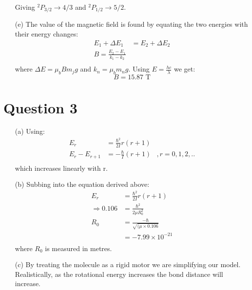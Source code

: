 \documentclass[10pt,a4paper]{article}
\begin{document}
\begin{itemize}
	Giving $^{2}P_{3/2} \rightarrow 4/3$ and $^{2}P_{1/2} \rightarrow 5/2$.

	\item[(e)] The value of the magnetic field is found by equating the two energies with their energy changes:
		\begin{align*}
			E_{1} + \Delta E_{1} &= E_{2} + \Delta E_{2} \\
			B = \frac{E_{2} - E_{1}}{k_{1}-k_{2}} \\
		\end{align*}
	where $\Delta E = \mu_{b}B m_{j}g$ and $k_{n} = \mu_{b}m_{n}g$. Using $E = \frac{hc}{\lambda}$ we get:
		\begin{equation*}
			B = 15.87 \mbox{ T}
		\end{equation*}
\end{itemize}

\section*{Question 3}
\begin{itemize}
	\item[(a)] Using:
		\begin{align*}
			E_{r} &= \frac{\hbar^{2}}{2I}r(r+1) &\\
			E_{r} - E_{r+1} &= -\frac{\hbar}{I}(r+1) &, r = 0,1,2,.. \\
		\end{align*}
		which increases linearly with r.
	
	\item[(b)] Subbing into the equation derived above:
		\begin{align*}
			E_{r} &= \frac{\hbar^{2}}{2I}r(r+1) \\
			\Rightarrow 0.106 &= \frac{\hbar^{2}}{2\mu R_{0}^{2}} \\
			R_{0} &= \frac{-\hbar}{\sqrt{(\mu \times 0.106}} \\
					  &= -7.99 \times 10^{-21} \\
		\end{align*}
	where $R_{0}$ is measured in metres.

	\item[(c)] By treating the molecule as a rigid motor we are simplifying our model. Realistically, as the rotational energy increases the bond distance will increase.
\end{itemize}
\end{document}

